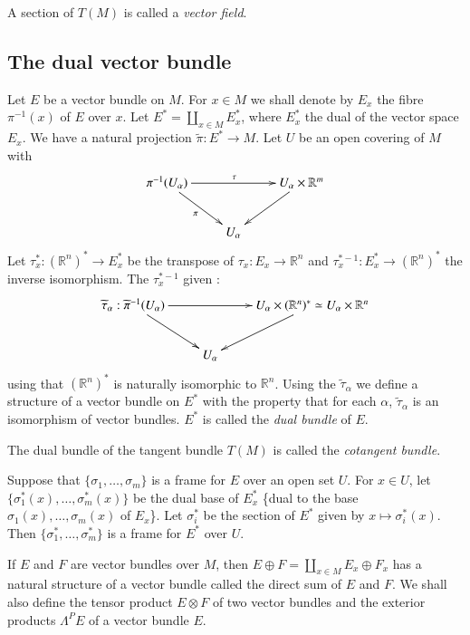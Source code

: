 A section of $T(M)$ is called a {\em vector field}.

\subsection*{The dual vector bundle}

Let $E$ be a vector bundle on $M$. For $x\in M$ we shall denote by $E_{x}$ the fibre $\pi^{-1}(x)$ of $E$ over $x$. Let $E^{*}=\coprod\limits_{x\in M}E^{*}_{x}$, where $E^{*}_{x}$ the dual of the vector space $E_{x}$. We have a natural projection $\widetilde{\pi}:E^{*}\to M$. Let $U$ be an open covering of $M$ with 
\[
\xymatrix{
\pi^{-1}(U_{\alpha})\ar[dr]_{\pi}\ar[rr]^{\tau} & & U_{\alpha}\times \mathbb{R}^{m}\ar[dl]\\
 & U_{\alpha}
}
\]
Let $\tau^{*}_{x}:(\mathbb{R}^{n})^{*}\to E^{*}_{x}$ be the transpose of $\tau_{x}:E_{x}\to \mathbb{R}^{n}$ and $\tau^{*-1}_{x}:E^{*}_{x}\to (\mathbb{R}^{n})^{*}$ the inverse isomorphism. The $\tau^{*-1}_{x}$ given :
\[
\xymatrix{
\widetilde{\tau}_{\alpha}:\widetilde{\pi}^{-1}(U_{\alpha})\ar[dr]\ar[rr] & & U_{\alpha}\times (\mathbb{R}^{n})^{*}\simeq U_{\alpha}\times \mathbb{R}^{n}\ar[dl]\\
 & U_{\alpha} &
}
\]\pageoriginale
using that $(\mathbb{R}^{n})^{*}$ is naturally isomorphic to $\mathbb{R}^{n}$. Using the $\widetilde{\tau}_{\alpha}$ we define a structure of a vector bundle on $E^{*}$ with the property that for each $\alpha$, $\widetilde{\tau}_{\alpha}$ is an isomorphism of vector bundles. $E^{*}$ is called the {\em dual bundle} of $E$.

The dual bundle of the tangent bundle $T(M)$ is called the {\em cotangent bundle}.

Suppose that $\{\sigma_{1},\ldots,\sigma_{m}\}$ is a frame for $E$ over an open set $U$. For $x\in U$, let $\{\sigma^{*}_{1}(x),\ldots,\sigma^{*}_{m}(x)\}$ be the dual base of $E^{*}_{x}$ \{dual to the base $\sigma_{1}(x),\ldots,\sigma_{m}(x)$ of $E_{x}$\}. Let $\sigma^{*}_{i}$ be the section of $E^{*}$ given by $x\mapsto \sigma^{*}_{i}(x)$. Then $\{\sigma^{*}_{1},\ldots,\sigma^{*}_{m}\}$ is a frame for $E^{*}$ over $U$.

If $E$ and $F$ are vector bundles over $M$, then $E\oplus F=\coprod\limits_{x\in M}E_{x}\oplus F_{x}$ has a natural structure of a vector bundle called the direct sum of $E$ and $F$. We shall also define the tensor product $E\otimes F$ of two vector bundles and the exterior products $\Lambda^{P}E$ of a vector bundle $E$.


